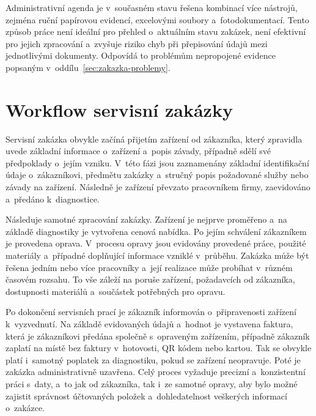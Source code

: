 Administrativní agenda je v~současném stavu řešena kombinací více nástrojů, zejména ruční papírovou evidencí, excelovými soubory a~fotodokumentací. Tento způsob práce není ideální pro přehled o~aktuálním stavu zakázek, není efektivní pro jejich zpracování a~zvyšuje riziko chyb při přepisování údajů mezi jednotlivými dokumenty. Odpovídá to problémům nepropojené evidence popsaným v~oddílu~\ref{sec:zakazka-problemy}.

\section{Workflow servisní zakázky}\label{sec:workflow}

Servisní zakázka obvykle začíná přijetím zařízení od zákazníka, který zpravidla uvede základní informace o~zařízení a~popis závady, případně sdělí své předpoklady o~jejím vzniku. V~této fázi jsou zaznamenány základní identifikační údaje o~zákazníkovi, předmětu zakázky a~stručný popis požadované služby nebo závady na zařízení. Následně je zařízení převzato pracovníkem firmy, zaevidováno a~předáno k~diagnostice.

Následuje samotné zpracování zakázky. Zařízení je nejprve proměřeno a~na základě diagnostiky je vytvořena cenová nabídka. Po jejím schválení zákazníkem je provedena oprava. V~procesu opravy jsou evidovány provedené práce, použité materiály a~případné doplňující informace vzniklé v~průběhu. Zakázka může být řešena jedním nebo více pracovníky a~její realizace může probíhat v~různém časovém rozsahu. To vše záleží na poruše zařízení, požadavcích od zákazníka, dostupnosti materiálů a~součástek potřebných pro opravu.

Po dokončení servisních prací je zákazník informován o~připravenosti zařízení k~vyzvednutí. Na základě evidovaných údajů a~hodnot je vystavena faktura, která je zákazníkovi předána společně s~opraveným zařízením, případně zákazník zaplatí na místě bez faktury v~hotovosti, QR kódem nebo kartou. Tak se obvykle platí i~samotný poplatek za diagnostiku, pokud se zařízení neopravuje. Poté je zakázka administrativně uzavřena. Celý proces vyžaduje precizní a~konzistentní práci s~daty, a~to jak od zákazníka, tak i~ze samotné opravy, aby bylo možné zajistit správnost účtovaných položek a~dohledatelnost veškerých informací o~zakázce.

